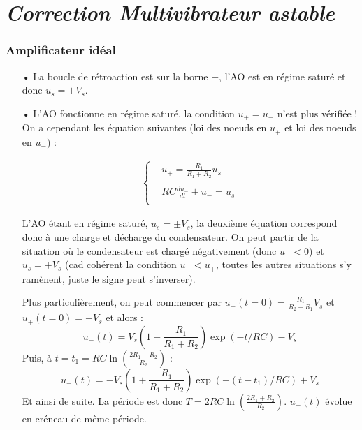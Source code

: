 \documentclass{report}
\begin{document}
\newpage

\section*{\textit{Correction Multivibrateur astable}}

\subsubsection{Amplificateur idéal}

\begin{itemize}
	\item[•] La boucle de rétroaction est sur la borne +, l'AO est en régime saturé et donc $u_s=\pm V_s$. 

	\item[•] L'AO fonctionne en régime saturé, la condition $u_+=u_-$ n'est plus vérifiée ! On a cependant les équation suivantes (loi des noeuds en $u_+$ et loi des noeuds en $u_-$) :
	
\begin{align}
	\left\lbrace
\begin{array}{cc}
	&  u_+=\frac{R_1}{R_1+R_2}u_s\\
	\\
	&RC\frac{du_-}{dt} +u_- =u_s  \\
\end{array}\right.
\end{align}	

L'AO étant en régime saturé, $u_s=\pm V_s$, la deuxième équation correspond donc à une charge et décharge du condensateur. On peut partir de la situation où le condensateur est chargé négativement (donc $u_-<0$) et $u_s=+V_s$ (cad cohérent la condition $u_-<u_+$, toutes les autres situations s'y ramènent, juste le signe peut s'inverser). 

	Plus particulièrement, on peut commencer par $u_-(t=0)=\frac{R_1}{R_2+R_1}V_s$ et $u_+(t=0)=-V_s$ et alors :
	\begin{equation}
		u_-(t)=V_s\left(1+\frac{R_1}{R_1+R_2}\right)\exp(-t/RC)-V_s 
	\end{equation}
Puis, à $t=t_1=RC\ln\left(\frac{2R_1+R_2}{R_2} \right)$ :
	\begin{equation}
		u_-(t)=-V_s\left(1+\frac{R_1}{R_1+R_2}\right)\exp(-(t-t_1)/RC)+V_s 
	\end{equation}
Et ainsi de suite. La période est donc $T = 2RC\ln\left(\frac{2R_1+R_2}{R_2} \right)$. $u_+(t)$ évolue en créneau de même période. 
\end{itemize}
\end{document}
